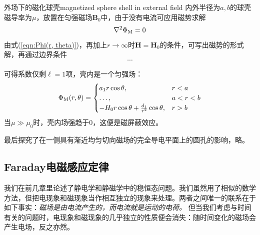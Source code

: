 \begin{example}{外场下的磁化球壳}{magnetized sphere shell in external field}
    内外半径为$a,b$的球壳磁导率为$\mu$，放置在匀强磁场$\bm B_0$中，由于没有电流可应用磁势求解
    \[
        \nabla^2\Phi_\text M=0
    \]
    由式(\ref{eqn:Phi(r, theta)})，再加上$r\to\infty$时$\bm H=\bm H_0$的条件，可写出磁势的形式解，再通过边界条件
    \[
        \cdots
    \]

    可得系数仅剩$\ell=1$项，壳内是一个匀强场：
    \[
        \Phi_\text M(r,\theta)=
        \begin{cases}
            a_1r\cos\theta,&r<a\\
            \ldots,&a<r<b\\
            -H_0r\cos\theta+\frac{d_1}{r^2}\cos\theta,&r>b
        \end{cases}
    \]
    当$\mu\gg\mu_0$时，壳内场强趋于0，这便是磁屏蔽效应。
\end{example}
最后探究了在一侧具有渐近均匀切向磁场的完全导电平面上的圆孔的影响，略。
\subsection{Faraday电磁感应定律}
\label{ssec:Faraday}
我们在前几章里论述了静电学和静磁学中的稳恒态问题。我们虽然用了相似的数学方法，但把电现象和磁现象当作相互独立的现象来处理。两者之间唯一的联系在于如下事实：\textit{磁场是由电流产生的，而电流就是运动的电荷。}
但当我们考虑与时间有关的问题时，电现象和磁现象的几乎独立的性质便会消失：随时间变化的磁场会产生电场，反之亦然。%

